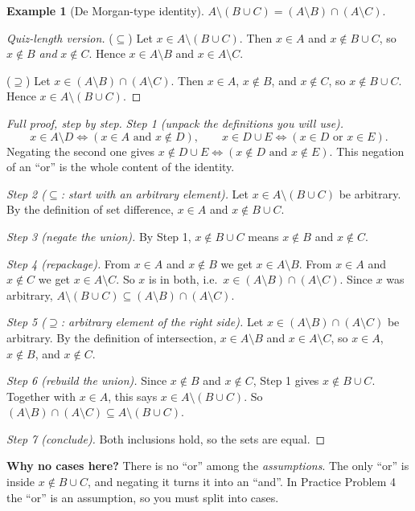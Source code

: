 \documentclass[11pt]{article}
\theoremstyle{definition}
\newtheorem{ex}[defn]{Example}
\newcommand{\key}[1]{\textcolor{red!70!black}{\textbf{#1}}}
\begin{document}
\begin{ex}[De Morgan-type identity]
$A\setminus(B\cup C)=(A\setminus B)\cap(A\setminus C)$.
\begin{proof}[Quiz-length version]
($\subseteq$) Let $x\in A\setminus(B\cup C)$. Then $x\in A$ and
$x\notin B\cup C$, so $x\notin B$ \emph{and} $x\notin C$. Hence
$x\in A\setminus B$ and $x\in A\setminus C$.

($\supseteq$) Let $x\in(A\setminus B)\cap(A\setminus C)$. Then $x\in A$,
$x\notin B$, and $x\notin C$, so $x\notin B\cup C$. Hence
$x\in A\setminus(B\cup C)$.
\end{proof}

\begin{proof}[Full proof, step by step]
\emph{Step 1 (unpack the definitions you will use).}
\[
x\in A\setminus D\iff (x\in A\text{ and }x\notin D),\qquad
x\in D\cup E\iff(x\in D\text{ or }x\in E).
\]
Negating the second one gives
$x\notin D\cup E\iff(x\notin D\text{ and }x\notin E)$. This negation of an
``or'' is the whole content of the identity.

\emph{Step 2 ($\subseteq$: start with an arbitrary element).} Let
$x\in A\setminus(B\cup C)$ be arbitrary. By the definition of set
difference, $x\in A$ and $x\notin B\cup C$.

\emph{Step 3 (negate the union).} By Step 1, $x\notin B\cup C$ means
$x\notin B$ and $x\notin C$.

\emph{Step 4 (repackage).} From $x\in A$ and $x\notin B$ we get
$x\in A\setminus B$. From $x\in A$ and $x\notin C$ we get
$x\in A\setminus C$. So $x$ is in both, i.e.\
$x\in(A\setminus B)\cap(A\setminus C)$. Since $x$ was arbitrary,
$A\setminus(B\cup C)\subseteq(A\setminus B)\cap(A\setminus C)$.

\emph{Step 5 ($\supseteq$: arbitrary element of the right side).} Let
$x\in(A\setminus B)\cap(A\setminus C)$ be arbitrary. By the definition of
intersection, $x\in A\setminus B$ and $x\in A\setminus C$, so $x\in A$,
$x\notin B$, and $x\notin C$.

\emph{Step 6 (rebuild the union).} Since $x\notin B$ and $x\notin C$,
Step 1 gives $x\notin B\cup C$. Together with $x\in A$, this says
$x\in A\setminus(B\cup C)$. So
$(A\setminus B)\cap(A\setminus C)\subseteq A\setminus(B\cup C)$.

\emph{Step 7 (conclude).} Both inclusions hold, so the sets are equal.
\end{proof}
\noindent\key{Why no cases here?} There is no ``or'' among the
\emph{assumptions}. The only ``or'' is inside $x\notin B\cup C$, and
negating it turns it into an ``and''. In Practice Problem 4 the ``or'' is
an assumption, so you must split into cases.
\end{ex}
\end{document}
